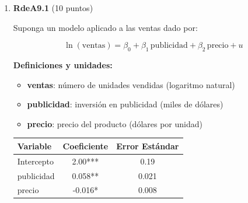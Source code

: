 \documentclass[10pt,a4paper]{article}
\begin{document}
\begin{enumerate}
  
$\boldsymbol{\beta_2}$: 
  implica que la pendiente de la relación entre \textit{tiempo} y \textit{carga}
aumenta en $2\beta_2 $ por cada unidad adicional de \textit{carga}.

Nos permite capturar los efectos no lineales de la carga sobre el tiempo de entrega, captura la segunda derivada de tiempo con respecto carga.  Si los valores poblacionales tienen los signos de los estimadores respectivos 

\color{black}
{b) (5 puntos) Determine el nivel de carga que minimiza el tiempo de entrega.}

\color{blue}
\medskip
Para encontrar el punto mínimo, derivamos la función respecto de \textit{carga}:

\[
\frac{d\,\text{tiempo}}{d\,\text{carga}} = -0.7 + 0.04\,\text{carga}
\]

Igualamos a cero para obtener el punto crítico:

\[
-0.7 + 0.04\,\text{carga} = 0
\quad \Rightarrow \quad
0.04\,\text{carga} = 0.7
\quad \Rightarrow \quad
\text{carga}^* = \frac{0.7}{0.04} = 17.5
\]

\textbf{Verificación del mínimo:}
\[
\frac{d^2\,\text{tiempo}}{d\,\text{carga}^2} = 0.04 > 0
\quad \Rightarrow \quad
\text{carga}^* \text{ corresponde a un mínimo.}
\]

\textbf{Conclusión:} 
El tiempo de entrega es mínimo cuando la carga de trabajo es de 
\[
\boxed{\text{carga}^* = 17.5\ \text{pedidos por día.}}
\]


\color{black}


 
 \item \textbf{RdeA9.1} (10 puntos) 

{Suponga un modelo aplicado a las ventas dado por:}

\[
\ln(\mathrm{ventas}) = \beta_0 + \beta_1\,\mathrm{publicidad} + \beta_2\,\mathrm{precio} + u
\]

\noindent
\textbf{Definiciones y unidades:}
\begin{itemize}
    \item \textbf{ventas}: número de unidades vendidas (logaritmo natural)
    \item \textbf{publicidad}: inversión en publicidad (miles de dólares)
    \item \textbf{precio}: precio del producto (dólares por unidad)
\end{itemize}

\begin{center}
\begin{tabular}{lcc}
\toprule
\textbf{Variable} & \textbf{Coeficiente} & \textbf{Error Estándar} \\
\midrule
Intercepto   & 2.00***  & 0.19 \\
publicidad   & 0.058**  & 0.021 \\
precio       & -0.016*  & 0.008 \\
\bottomrule
\end{tabular}


\end{center}
\end{enumerate}
\end{document}
